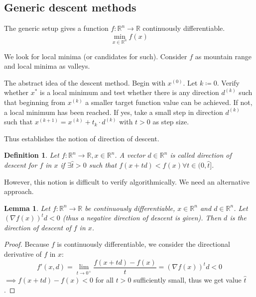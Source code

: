 \documentclass[a4paper]{article}
\newcounter{lecref}[subsection]
\numberwithin{lecref}{subsection}
\newtheorem{definition}[lecref]{Definition}
\newtheorem{lemma}[lecref]{Lemma}
\begin{document}
\subsection{Generic descent methods}

The generic setup gives a function $f: \mathbb R^n \to \mathbb R$ continuously differentiable.
\[ \min_{x \in \mathbb R^n} f(x) \]

We look for local minima (or candidates for such).
Consider $f$ as mountain range and local minima as valleys.

The abstract idea of the descent method.
Begin with $x^{(0)}$. Let $k \coloneqq 0$. Verify whether $x^*$ is a local minimum and test whether there is any direction $d^{(k)}$ such that beginning from $x^{(k)}$ a smaller target function value can be achieved.
If not, a local minimum has been reached. If yes, take a small step in direction $d^{(k)}$ such that $x^{(k+1)} = x^{(k)} + t_k \cdot d^{(k)}$ with $t > 0$ as step size.

Thus establishes the notion of direction of descent.
\begin{definition}
	Let $f: \mathbb R^n \to \mathbb R, x \in \mathbb R^n$.
	A vector $d \in \mathbb R^n$ is called \emph{direction of descent} for $f$ in $x$ if $\exists \hat t > 0$ such that $f(x + td) < f(x) \forall t \in (0, \hat t]$.
\end{definition}

However, this notion is difficult to verify algorithmically. We need an alternative approach.

\begin{lemma}
	\label{lemma:5.3.1}
	Let $f: \mathbb R^n \to \mathbb R$ be continuously differentiable, $x \in \mathbb R^n$ and $d \in \mathbb R^n$.
	Let $(\nabla f(x))^t d < 0$ (thus a negative direction of descent is given).
	Then $d$ is the direction of descent of $f$ in $x$.
\end{lemma}

\begin{proof}
	Because $f$ is continuously differentiable, we consider the directional derivative of $f$ in $x$:
	\[ f'(x, d) = \lim_{t \to 0^+} \frac{f(x + td) - f(x)}{t} = \left(\nabla f(x)\right)^t d < 0 \]
	$\implies f(x + td) - f(x) < 0$ for all $t > 0$ sufficiently small, thus we get value $\hat t$.
\end{proof}
\end{document}
